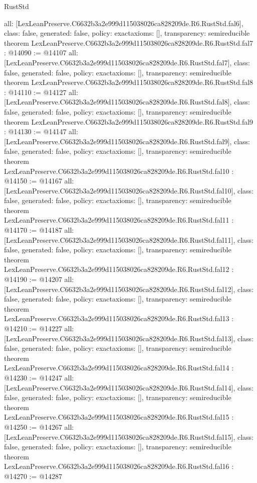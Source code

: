 \begin{lexlean}{RustStd}
\begin{coremodule}
{  all: [LexLeanPreserve.C6632b3a2e999d115038026ca828209de.R6.RustStd.fal6],
  class: false,
  generated: false,
  policy: exact{axioms: []},
  transparency: semireducible
}
theorem LexLeanPreserve.C6632b3a2e999d115038026ca828209de.R6.RustStd.fal7 : @14090 := @14107 {
  all: [LexLeanPreserve.C6632b3a2e999d115038026ca828209de.R6.RustStd.fal7],
  class: false,
  generated: false,
  policy: exact{axioms: []},
  transparency: semireducible
}
theorem LexLeanPreserve.C6632b3a2e999d115038026ca828209de.R6.RustStd.fal8 : @14110 := @14127 {
  all: [LexLeanPreserve.C6632b3a2e999d115038026ca828209de.R6.RustStd.fal8],
  class: false,
  generated: false,
  policy: exact{axioms: []},
  transparency: semireducible
}
theorem LexLeanPreserve.C6632b3a2e999d115038026ca828209de.R6.RustStd.fal9 : @14130 := @14147 {
  all: [LexLeanPreserve.C6632b3a2e999d115038026ca828209de.R6.RustStd.fal9],
  class: false,
  generated: false,
  policy: exact{axioms: []},
  transparency: semireducible
}
theorem LexLeanPreserve.C6632b3a2e999d115038026ca828209de.R6.RustStd.fal10 : @14150 := @14167 {
  all: [LexLeanPreserve.C6632b3a2e999d115038026ca828209de.R6.RustStd.fal10],
  class: false,
  generated: false,
  policy: exact{axioms: []},
  transparency: semireducible
}
theorem LexLeanPreserve.C6632b3a2e999d115038026ca828209de.R6.RustStd.fal11 : @14170 := @14187 {
  all: [LexLeanPreserve.C6632b3a2e999d115038026ca828209de.R6.RustStd.fal11],
  class: false,
  generated: false,
  policy: exact{axioms: []},
  transparency: semireducible
}
theorem LexLeanPreserve.C6632b3a2e999d115038026ca828209de.R6.RustStd.fal12 : @14190 := @14207 {
  all: [LexLeanPreserve.C6632b3a2e999d115038026ca828209de.R6.RustStd.fal12],
  class: false,
  generated: false,
  policy: exact{axioms: []},
  transparency: semireducible
}
theorem LexLeanPreserve.C6632b3a2e999d115038026ca828209de.R6.RustStd.fal13 : @14210 := @14227 {
  all: [LexLeanPreserve.C6632b3a2e999d115038026ca828209de.R6.RustStd.fal13],
  class: false,
  generated: false,
  policy: exact{axioms: []},
  transparency: semireducible
}
theorem LexLeanPreserve.C6632b3a2e999d115038026ca828209de.R6.RustStd.fal14 : @14230 := @14247 {
  all: [LexLeanPreserve.C6632b3a2e999d115038026ca828209de.R6.RustStd.fal14],
  class: false,
  generated: false,
  policy: exact{axioms: []},
  transparency: semireducible
}
theorem LexLeanPreserve.C6632b3a2e999d115038026ca828209de.R6.RustStd.fal15 : @14250 := @14267 {
  all: [LexLeanPreserve.C6632b3a2e999d115038026ca828209de.R6.RustStd.fal15],
  class: false,
  generated: false,
  policy: exact{axioms: []},
  transparency: semireducible
}
theorem LexLeanPreserve.C6632b3a2e999d115038026ca828209de.R6.RustStd.fal16 : @14270 := @14287 {
}
\end{coremodule}
\end{lexlean}
